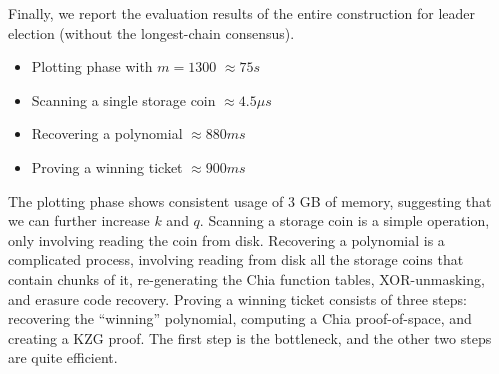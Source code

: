 \documentclass[conference]{IEEEtran}
\begin{document}
Finally, we report the evaluation results of the entire construction for leader election (without the longest-chain consensus).
\begin{itemize}
    \item Plotting phase with $m = 1300$ $\approx 75 s$
    \item Scanning a single storage coin $\approx 4.5 \mu s$
    \item Recovering a polynomial $\approx 880 ms$
    \item Proving a winning ticket $\approx 900 ms$
\end{itemize}
The plotting phase shows consistent usage of 3 GB of memory, suggesting that we can further increase $k$ and $q$.
Scanning a storage coin is a simple operation, only involving reading the coin from disk.
Recovering a polynomial is a complicated process, involving reading from disk all the storage coins that contain chunks of it, re-generating the Chia function tables,  XOR-unmasking, and erasure code recovery.
Proving a winning ticket consists of three steps: recovering the ``winning'' polynomial, computing a Chia proof-of-space, and creating a KZG proof. The first step is the bottleneck, and the other two steps are quite efficient.
\end{document}
